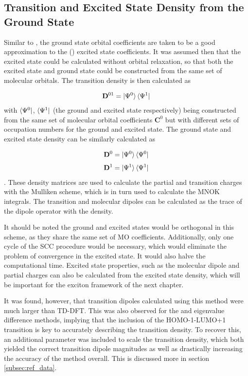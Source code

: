 \subsection{Transition and Excited State Density from the Ground State}

Similar to \dscf, the ground state orbital coefficients are taken to be a good
approximation to the (\Qy) excited state coefficients. It was assumed then that
the excited state could be calculated without orbital relaxation, so that both the
excited state and ground state could be constructed from the same set of molecular
orbitals. The transition density is then calculated as

\begin{equation}
\mathbf{D}^{01} = \ket{\Psi^0} \bra{\Psi^1} 
\end{equation}
%
with $\bra{\Psi^0}$, $\bra{\Psi^1}$ (the ground and excited state respectively)
being constructed from the same set of molecular orbital coefficients $\mathbf{C}^0$
but with different sets of occupation numbers for the ground and excited state.
The ground state and excited state density can be similarly calculated as

\begin{equation}
\mathbf{D}^{0} = \ket{\Psi^0} \bra{\Psi^0}  
\end{equation}
%
\begin{equation}
\mathbf{D}^{1} = \ket{\Psi^1} \bra{\Psi^1}  
\end{equation}
%
. These density matrices are used to calculate the partial and transition charges
with the Mulliken scheme, which is in turn used to calculate the MNOK integrals.
The transition and molecular dipoles can be calculated as the trace of the dipole
operator with the density.

It should be noted the ground and excited states would be orthogonal in this scheme,
as they share the same set of MO coefficients. Additionally, only one cycle of the
SCC procedure would be necessary, which would eliminate the problem of convergence
in the \dscf excited state. It would also halve the computational time. Excited
state properties, such as the molecular dipole and partial charges can also be
calculated from the excited state density, which will be important for the exciton 
framework of the next chapter.

It was found, however, that transition dipoles calculated using this method were
much larger than TD-DFT. This was also observed for the \dscf and eigenvalue
difference methods, implying that the inclusion of the HOMO-1-LUMO+1 transition
is key to accurately describing the transition density. To recover this, an additional
parameter was included to scale the transition density, which both yielded the 
correct transition dipole magnitudes as well as drastically increasing the accuracy
of the method overall. This is discussed more in section \ref{subsec:ref_data}.

